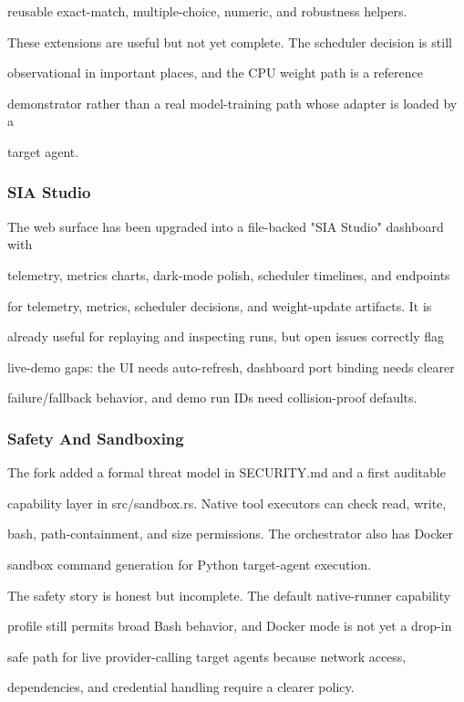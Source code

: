 \documentclass[twocolumn,10pt,letterpaper]{article}
\begin{document}
reusable exact-match, multiple-choice, numeric, and robustness helpers.


These extensions are useful but not yet complete. The scheduler decision is still

observational in important places, and the CPU weight path is a reference

demonstrator rather than a real model-training path whose adapter is loaded by a

target agent.


\subsubsection{SIA Studio}

The web surface has been upgraded into a file-backed "SIA Studio" dashboard with

telemetry, metrics charts, dark-mode polish, scheduler timelines, and endpoints

for telemetry, metrics, scheduler decisions, and weight-update artifacts. It is

already useful for replaying and inspecting runs, but open issues correctly flag

live-demo gaps: the UI needs auto-refresh, dashboard port binding needs clearer

failure/fallback behavior, and demo run IDs need collision-proof defaults.


\subsubsection{Safety And Sandboxing}

The fork added a formal threat model in SECURITY.md and a first auditable

capability layer in src/sandbox.rs. Native tool executors can check read, write,

bash, path-containment, and size permissions. The orchestrator also has Docker

sandbox command generation for Python target-agent execution.


The safety story is honest but incomplete. The default native-runner capability

profile still permits broad Bash behavior, and Docker mode is not yet a drop-in

safe path for live provider-calling target agents because network access,

dependencies, and credential handling require a clearer policy.
\end{document}
